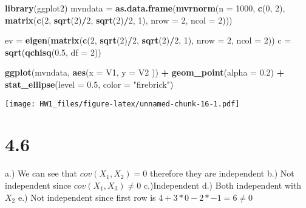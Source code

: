 \documentclass[
]{article}
\newenvironment{Shaded}{\begin{snugshade}}{\end{snugshade}}
\newcommand{\DataTypeTok}[1]{\textcolor[rgb]{0.13,0.29,0.53}{#1}}
\newcommand{\DecValTok}[1]{\textcolor[rgb]{0.00,0.00,0.81}{#1}}
\newcommand{\FloatTok}[1]{\textcolor[rgb]{0.00,0.00,0.81}{#1}}
\newcommand{\KeywordTok}[1]{\textcolor[rgb]{0.13,0.29,0.53}{\textbf{#1}}}
\newcommand{\NormalTok}[1]{#1}
\newcommand{\OperatorTok}[1]{\textcolor[rgb]{0.81,0.36,0.00}{\textbf{#1}}}
\newcommand{\StringTok}[1]{\textcolor[rgb]{0.31,0.60,0.02}{#1}}
\begin{document}
\begin{Shaded}
\begin{Highlighting}[]
\KeywordTok{library}\NormalTok{(ggplot2)}
\NormalTok{mvndata =}\StringTok{ }\KeywordTok{as.data.frame}\NormalTok{(}\KeywordTok{mvrnorm}\NormalTok{(}\DataTypeTok{n =} \DecValTok{1000}\NormalTok{, }\KeywordTok{c}\NormalTok{(}\DecValTok{0}\NormalTok{, }\DecValTok{2}\NormalTok{), }\KeywordTok{matrix}\NormalTok{(}\KeywordTok{c}\NormalTok{(}\DecValTok{2}\NormalTok{, }\KeywordTok{sqrt}\NormalTok{(}\DecValTok{2}\NormalTok{)}\OperatorTok{/}\DecValTok{2}\NormalTok{, }\KeywordTok{sqrt}\NormalTok{(}\DecValTok{2}\NormalTok{)}\OperatorTok{/}\DecValTok{2}\NormalTok{, }\DecValTok{1}\NormalTok{), }\DataTypeTok{nrow =} \DecValTok{2}\NormalTok{, }\DataTypeTok{ncol =} \DecValTok{2}\NormalTok{)))}

\NormalTok{ev =}\StringTok{ }\KeywordTok{eigen}\NormalTok{(}\KeywordTok{matrix}\NormalTok{(}\KeywordTok{c}\NormalTok{(}\DecValTok{2}\NormalTok{, }\KeywordTok{sqrt}\NormalTok{(}\DecValTok{2}\NormalTok{)}\OperatorTok{/}\DecValTok{2}\NormalTok{, }\KeywordTok{sqrt}\NormalTok{(}\DecValTok{2}\NormalTok{)}\OperatorTok{/}\DecValTok{2}\NormalTok{, }\DecValTok{1}\NormalTok{), }\DataTypeTok{nrow =} \DecValTok{2}\NormalTok{, }\DataTypeTok{ncol =} \DecValTok{2}\NormalTok{))}
\NormalTok{c =}\StringTok{ }\KeywordTok{sqrt}\NormalTok{(}\KeywordTok{qchisq}\NormalTok{(}\FloatTok{0.5}\NormalTok{, }\DataTypeTok{df =} \DecValTok{2}\NormalTok{))}

\KeywordTok{ggplot}\NormalTok{(mvndata, }\KeywordTok{aes}\NormalTok{(}\DataTypeTok{x =}\NormalTok{ V1, }\DataTypeTok{y =}\NormalTok{ V2 )) }\OperatorTok{+}\StringTok{ }\KeywordTok{geom_point}\NormalTok{(}\DataTypeTok{alpha =} \FloatTok{0.2}\NormalTok{) }\OperatorTok{+}\StringTok{ }\KeywordTok{stat_ellipse}\NormalTok{(}\DataTypeTok{level =} \FloatTok{0.5}\NormalTok{, }\DataTypeTok{color =} \StringTok{"firebrick"}\NormalTok{)}
\end{Highlighting}
\end{Shaded}

\texttt{[image: HW1\_files/figure-latex/unnamed-chunk-16-1.pdf]}

\hypertarget{section}{%
\section{4.6}\label{section}}

a.) We can see that \(cov(X_1, X_2) = 0\) therefore they are independent
b.) Not independent since \(cov(X_1, X_3) \neq 0\) c.)Independent d.)
Both independent with \(X_2\) e.) Not independent since first row is
\(4 + 3*0 - 2*-1 = 6 \neq 0\)
\end{document}
